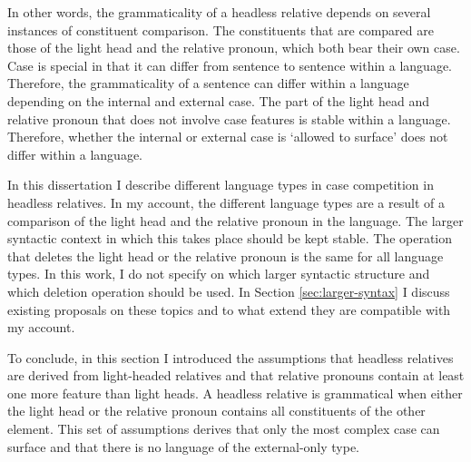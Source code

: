 In other words, the grammaticality of a headless relative depends on several instances of constituent comparison. The constituents that are compared are those of the light head and the relative pronoun, which both bear their own case. Case is special in that it can differ from sentence to sentence within a language. Therefore, the grammaticality of a sentence can differ within a language depending on the internal and external case. The part of the light head and relative pronoun that does not involve case features is stable within a language. Therefore, whether the internal or external case is `allowed to surface' does not differ within a language.

In this dissertation I describe different language types in case competition in headless relatives. In my account, the different language types are a result of a comparison of the light head and the relative pronoun in the language.
The larger syntactic context in which this takes place should be kept stable. The operation that deletes the light head or the relative pronoun is the same for all language types. In this work, I do not specify on which larger syntactic structure and which deletion operation should be used. In Section \ref{sec:larger-syntax} I discuss existing proposals on these topics and to what extend they are compatible with my account.

To conclude, in this section I introduced the assumptions that headless relatives are derived from light-headed relatives and that relative pronouns contain at least one more feature than light heads. A headless relative is grammatical when either the light head or the relative pronoun contains all constituents of the other element. This set of assumptions derives that only the most complex case can surface and that there is no language of the external-only type.

